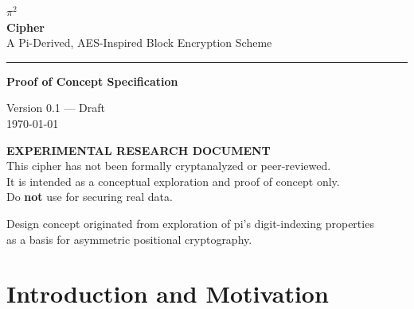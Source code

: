 \documentclass[12pt, a4paper]{article}
\begin{document}

\begin{titlepage}
  \centering
  \vspace*{2cm}

  {\fontsize{48}{56}\selectfont $\pi^2$}\\[0.4em]
  {\Huge\bfseries\color{pigreen} Cipher}\\[0.8em]
  {\large\color{pigray} A Pi-Derived, AES-Inspired Block Encryption Scheme}

  \vspace{1.5cm}
  \textcolor{piborder}{\rule{0.6\linewidth}{1pt}}
  \vspace{1.2cm}

  \begin{large}
  \textbf{Proof of Concept Specification}\\[0.5em]
  \end{large}

  \vspace{0.5cm}
  {\color{pigray}
  Version 0.1 — Draft\\[0.3em]
  \today
  }

  \vspace{2cm}

  \begin{mdframed}[linecolor=piamber, linewidth=1.2pt, backgroundcolor=yellow!5, innerleftmargin=16pt, innerrightmargin=16pt, innertopmargin=10pt, innerbottommargin=10pt]
    \centering\small\color{piamber}
    \textbf{EXPERIMENTAL RESEARCH DOCUMENT}\\[0.3em]
    \color{pigray}
    This cipher has not been formally cryptanalyzed or peer-reviewed.\\
    It is intended as a conceptual exploration and proof of concept only.\\
    Do \textbf{not} use for securing real data.
  \end{mdframed}

  \vfill
  {\small\color{pigray} Design concept originated from exploration of pi's digit-indexing properties\\as a basis for asymmetric positional cryptography.}
\end{titlepage}

\tableofcontents
\newpage

\section{Introduction and Motivation}
\end{document}

